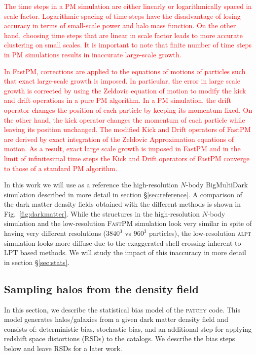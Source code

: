 \documentclass[english,usenatbib]{mn2e}
\newcommand{\tod}[1]{{\textcolor{red}{ #1}}}
\begin{document}
\tod{The time steps in a PM simulation are either linearly
or logarithmically spaced in scale factor. Logarithmic
spacing of time steps have the disadvantage of losing
accuracy in terms of small-scale power and halo mass
function. On the other hand, choosing time steps that are
linear in scale factor leads to more accurate clustering
on small scales. It is important to note that finite number of time steps in PM simulations results in inaccurate
large-scale growth.}

\tod{In FastPM, corrections are applied to the equations
of motions of particles such that exact large-scale growth
is imposed. In particular, the error in large scale growth is
corrected by using the Zeldovic equation of motion to modify
the kick and drift operations in a pure PM algorithm.
In a PM simulation, the drift operator changes the position
of each particle by keeping its momentum fixed. On
the other hand, the kick operator changes the momentum
of each particle while leaving its position unchanged. The
modified Kick and Drift operators of FastPM are derived
by exact integration of the Zeldovic Approximation equations
of motion. As a result, exact large scale growth is
imposed in FastPM and in the limit of infinitesimal time
steps the Kick and Drift operators of FastPM converge
to those of a standard PM algorithm.}

In this work we will use as a reference the high-resolution $N$-body BigMultiDark simulation described in more detail in section \S \ref{sec:reference}.
A comparison of the dark matter density fields obtained with the different methods is shown in Fig.~\ref{fig:darkmatter}. While the structures in the high-resolution $N$-body simulation and the low-resolution \textsc{FastPM} simulation look very similar in spite of having very different resolutions ($3840^3$ vs $960^3$ particles), the low-resolution \textsc{alpt} simulation looks more diffuse due to the exaggerated shell crossing inherent to LPT based methods. We will study the impact of this inaccuracy in more detail in section \S \ref{sec:stats}. 

\subsection{Sampling halos from the density field}
\label{sec:bias}

In this section, we describe the statistical bias model of the \textsc{patchy} code.  This model generates halos/galaxies from a given dark matter density field and consists of: deterministic bias, stochastic bias, and an additional step for applying redshift space distortions (RSDs) to the catalogs. We describe the bias steps below and leave RSDs for a later work. 
\end{document}
